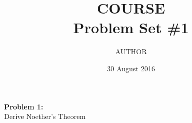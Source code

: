 \documentclass[12pt]{article}
\newcommand{\problem}[2]{\vspace{1em} \textbf{#1:} \\ {#2}}
\begin{document}
\title{\vspace{-4em}COURSE \\ Problem Set \#1}
\author{AUTHOR}
\date{30 August 2016}
\maketitle

\problem{Problem 1}{Derive Noether's Theorem} \\

\end{document}

